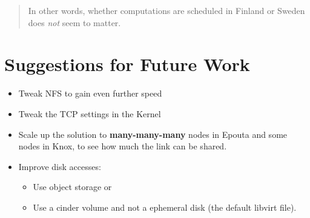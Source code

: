 \begin{quote}
In other words, whether computations are scheduled in Finland or Sweden
does \emph{not} seem to matter.
\end{quote}

\section{Suggestions for Future Work}\label{suggestions-for-future-work}

\begin{itemize}
\item
  Tweak NFS to gain even further speed
\item
  Tweak the TCP settings in the Kernel
\item
  Scale up the solution to \textbf{many-many-many} nodes in Epouta and
  some nodes in Knox, to see how much the link can be shared.
\item
  Improve disk accesses:

  \begin{itemize}
  \item
    Use object storage or
  \item
    Use a cinder volume and not a ephemeral disk (\ie the default libvirt
    file).
  \end{itemize}
\end{itemize}

